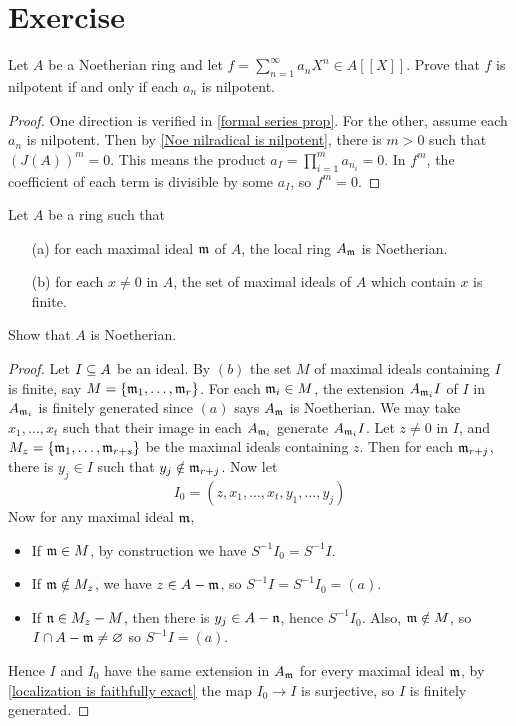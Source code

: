 \section{Exercise}
\begin{exercise}
Let $A$ be a Noetherian ring and let $f=\sum_{n=1}^{\infty}a_nX^n\in A[[X]]$. Prove that $f$ is nilpotent if and only if each $a_n$ is nilpotent.
\end{exercise}
\begin{proof}
One direction is verified in \cref{formal series prop}. For the other, assume each $a_n$ is nilpotent. Then by \cref{Noe nilradical is nilpotent}, there is $m>0$ such that $(J(A))^m=0$. This means the product $a_I=\prod_{i=1}^ma_{n_i}=0$. In $f^m$, the coefficient of each term is divisible by some $a_I$, so $f^m=0$.
\end{proof}
\begin{exercise}
Let $A$ be a ring such that
\begin{itemize}
\item[(a)] for each maximal ideal $\mathfrak{m}$ of $A$, the local ring $A_{\mathfrak{m}}$ is Noetherian.
\item[(b)] for each $x\neq 0$ in $A$, the set of maximal ideals of $A$ which contain $x$ is finite.
\end{itemize}
Show that $A$ is Noetherian.
\end{exercise}
\begin{proof}
Let $I\subseteq A$ be an ideal. By $(b)$ the set $M$ of maximal ideals containing $I$ is finite, say $M=\{\mathfrak{m}_1,\dots,\mathfrak{m}_r\}$. For each $\mathfrak{m}_i\in M$, the extension $A_{\mathfrak{m}_i}I$ of $I$ in $A_{\mathfrak{m}_i}$ is finitely generated since $(a)$ says $A_{\mathfrak{m}}$ is Noetherian. We may take $x_1,\dots,x_t$ such that their image in each $A_{\mathfrak{m}_i}$ generate $A_{\mathfrak{m}_i}I$. Let $z\neq 0$ in $I$, and $M_z=\{\mathfrak{m}_1,\dots,\mathfrak{m}_{r+s}\}$ be the maximal ideals containing $z$. Then for each $\mathfrak{m}_{r+j}$, there is $y_j\in I$ such that $y_j\notin\mathfrak{m}_{r+j}$. Now let
\[I_0=(z,x_1,\dots,x_t,y_1,\dots,y_j)\]
Now for any maximal ideal $\mathfrak{m}$, 
\begin{itemize}
\item If $\mathfrak{m}\in M$, by construction we have $S^{-1}I_0=S^{-1}I$.
\item If $\mathfrak{m}\notin M_z$, we have $z\in A-\mathfrak{m}$, so $S^{-1}I=S^{-1}I_0=(a)$.
\item If $\mathfrak{n}\in M_z-M$, then there is $y_j\in A-\mathfrak{n}$, hence $S^{-1}I_0$. Also, $\mathfrak{m}\notin M$, so $I\cap A-\mathfrak{m}\neq\varnothing$ so $S^{-1}I=(a)$.
\end{itemize}  
Hence $I$ and $I_0$ have the same extension in $A_{\mathfrak{m}}$ for every maximal ideal $\mathfrak{m}$, by \cref{localization is faithfully exact} the map $I_0\to I$ is surjective, so $I$ is finitely generated.
\end{proof}
